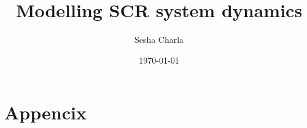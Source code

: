 \documentclass[letterpaper, 11pt]{article}
\title{Modelling SCR system dynamics}
\author{Sesha Charla}
\date{\today}
\begin{document}
\maketitle
\tableofcontents
\newpage

\newpage

\newpage

\newpage

\newpage

\newpage

\newpage

\newpage

\newpage

\newpage
\section{Appencix}


\newpage
\nocite{}


\end{document}
